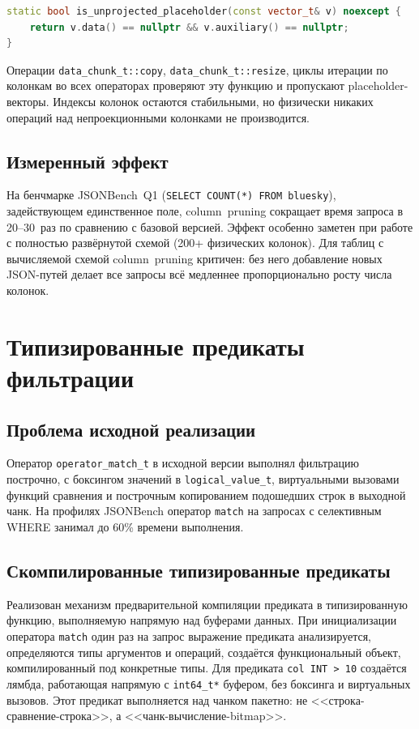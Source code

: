 \begin{lstlisting}[language=C++,caption={Детекция placeholder-вектора},
                   label={lst:placeholder}]
static bool is_unprojected_placeholder(const vector_t& v) noexcept {
    return v.data() == nullptr && v.auxiliary() == nullptr;
}
\end{lstlisting}

Операции \texttt{data\_chunk\_t::copy},
\texttt{data\_chunk\_t::resize}, циклы итерации по колонкам во
всех операторах проверяют эту функцию и пропускают
placeholder-векторы. Индексы колонок остаются стабильными, но
физически никаких операций над непроекционными колонками не
производится.

\subsection{Измеренный эффект}

На бенчмарке JSONBench~Q1 (\texttt{SELECT COUNT(*) FROM bluesky}),
задействующем единственное поле, column~pruning сокращает время
запроса в 20--30~раз по сравнению с базовой версией. Эффект особенно
заметен при работе с полностью развёрнутой схемой (200+ физических
колонок). Для таблиц с вычисляемой схемой column~pruning критичен:
без него добавление новых JSON-путей делает все запросы всё
медленнее пропорционально росту числа колонок.

\section{Типизированные предикаты фильтрации}

\subsection{Проблема исходной реализации}

Оператор \texttt{operator\_match\_t} в исходной версии выполнял фильтрацию построчно, с боксингом значений
в \texttt{logical\_value\_t}, виртуальными вызовами функций
сравнения и построчным копированием подошедших строк в выходной
чанк. На профилях JSONBench оператор \texttt{match} на запросах с
селективным WHERE занимал до 60\% времени выполнения.

\subsection{Скомпилированные типизированные предикаты}

Реализован механизм предварительной компиляции предиката в
типизированную функцию, выполняемую напрямую над буферами данных.
При инициализации оператора \texttt{match} один раз на запрос
выражение предиката анализируется, определяются типы аргументов и
операций, создаётся функциональный объект, компилированный под
конкретные типы. Для предиката \texttt{col~INT > 10} создаётся
лямбда, работающая напрямую с \texttt{int64\_t*} буфером, без
боксинга и виртуальных вызовов. Этот предикат выполняется над
чанком пакетно: не <<строка-сравнение-строка>>, а
<<чанк-вычисление-bitmap>>.

